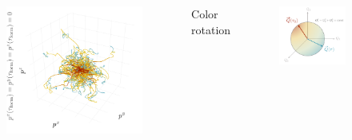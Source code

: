 \documentclass[aspectratio=169,11pt,usenames,dvipsnames]{beamer}
\begin{document}
\begin{frame}[noframenumbering]
\begin{columns}[onlytextwidth,t]
\begin{figure}[!hbt]
                \includegraphics[width=1.1\columnwidth]{images/wong_mom.png}
            \end{figure}
            \begin{center}
                Color rotation
            \end{center}
            \vspace{-15pt}
            \begin{figure}[!hbt]
                \centering
                \includegraphics[width=1.05\columnwidth]{images/wong_charge.png}
            \end{figure}
    \end{columns}
\end{frame}
\end{document}
